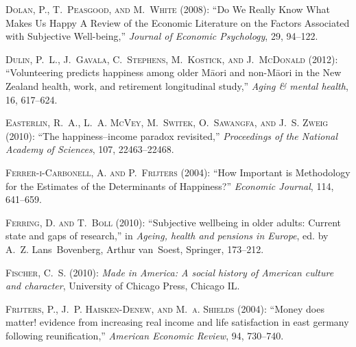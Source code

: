 \textsc{Dolan, P., T.~Peasgood, and M.~White} (2008): \enquote{Do We Really
  Know What Makes Us Happy A Review of the Economic Literature on the Factors
  Associated with Subjective Well-being,} \emph{Journal of Economic
  Psychology}, 29, 94--122.

\textsc{Dulin, P.~L., J.~Gavala, C.~Stephens, M.~Kostick, and J.~McDonald}
  (2012): \enquote{Volunteering predicts happiness among older M{\=a}ori and
  non-M{\=a}ori in the New Zealand health, work, and retirement longitudinal
  study,} \emph{Aging \& mental health}, 16, 617--624.

\textsc{Easterlin, R.~A., L.~A. McVey, M.~Switek, O.~Sawangfa, and J.~S. Zweig}
  (2010): \enquote{The happiness--income paradox revisited,} \emph{Proceedings
  of the National Academy of Sciences}, 107, 22463--22468.

\textsc{{Ferrer-i-Carbonell}, A. and P.~Frijters} (2004): \enquote{How
  Important is Methodology for the Estimates of the Determinants of Happiness?}
  \emph{Economic Journal}, 114, 641--659.

\textsc{Ferring, D. and T.~Boll} (2010): \enquote{Subjective wellbeing in older
  adults: Current state and gaps of research,} in \emph{Ageing, health and
  pensions in Europe}, ed. by A.~Z. Lans~Bovenberg, Arthur van~Soest, Springer,
  173--212.

\textsc{Fischer, C.~S.} (2010): \emph{Made in America: A social history of
  American culture and character}, University of Chicago Press, Chicago IL.

\textsc{Frijters, P., J.~P. Haisken-Denew, and M.~a. Shields} (2004):
  \enquote{{Money does matter! evidence from increasing real income and life
  satisfaction in east germany following reunification},} \emph{American
  Economic Review}, 94, 730--740.

